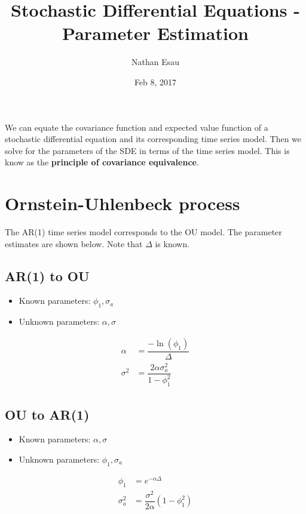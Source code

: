 \documentclass[12pt]{article}
\title{Stochastic Differential Equations - Parameter Estimation}
\author{Nathan Esau}
\date{Feb 8, 2017}
\begin{document}
\maketitle

We can equate the covariance function and expected value function of a stochastic differential equation and its corresponding time series model. Then we solve for the parameters of the SDE in terms of the time series model. This is know as the \textbf{principle of covariance equivalence}.

\section{Ornstein-Uhlenbeck process}

The AR(1) time series model corresponds to the OU model. The parameter estimates are shown below. Note that $\Delta$ is known.

\subsection{AR(1) to OU}

\begin{itemize}
\item Known parameters: $\phi_{1}, \sigma_{a}$
\item Unknown parameters: $\alpha, \sigma$
\end{itemize}

\begin{align}
\alpha &= \dfrac{-\ln(\phi_{1})}{\Delta} \\
\sigma^2 &= \dfrac{2\alpha \sigma_{a}^{2}}{1 - \phi_{1}^{2}}
\end{align}

\subsection{OU to AR(1)}

\begin{itemize}
\item Known parameters: $\alpha, \sigma$
\item Unknown parameters: $\phi_{1}, \sigma_{a}$
\end{itemize}

\begin{align}
\phi_{1} &= e^{-\alpha \Delta} \\
\sigma_{a}^{2} &= \dfrac{\sigma^2}{2\alpha} (1 - \phi_{1}^{2})
\end{align}
\end{document}
